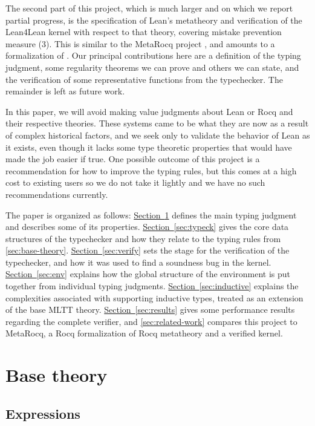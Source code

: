 \documentclass[sigplan,10pt,screen]{acmart}\settopmatter{printfolios=true,printccs=false,printacmref=false}
\newcommand{\lfl}{\textsf{Lean4Lean}\xspace}
\newcommand{\sref}[2]{\hyperref[#2]{#1~\ref{#2}}}
\begin{document}
The second part of this project, which is much larger and on which we report partial progress, is the specification of Lean's metatheory and verification of the \lfl kernel with respect to that theory, covering mistake prevention measure (3). This is similar to the MetaRocq project \cite{sozeau20,coqcoqcorrect}, and amounts to a formalization of \cite{leantt}. Our principal contributions here are a definition of the typing judgment, some regularity theorems we can prove and others we can state, and the verification of some representative functions from the typechecker. The remainder is left as future work.

In this paper, we will avoid making value judgments about Lean or Rocq and their respective theories. These systems came to be what they are now as a result of complex historical factors, and we seek only to validate the behavior of Lean as it exists, even though it lacks some type theoretic properties that would have made the job easier if true. One possible outcome of this project is a recommendation for how to improve the typing rules, but this comes at a high cost to existing users so we do not take it lightly and we have no such recommendations currently.

The paper is organized as follows: \sref{Section}{sec:base-theory} defines the main typing judgment and describes some of its properties. \sref{Section}{sec:typeck} gives the core data structures of the typechecker and how they relate to the typing rules from \autoref{sec:base-theory}. \sref{Section}{sec:verify} sets the stage for the verification of the typechecker, and how it was used to find a soundness bug in the kernel. \sref{Section}{sec:env} explains how the global structure of the environment is put together from individual typing judgments. \sref{Section}{sec:inductive} explains the complexities associated with supporting inductive types, treated as an extension of the base MLTT theory. \sref{Section}{sec:results} gives some performance results regarding the complete verifier, and \autoref{sec:related-work} compares this project to MetaRocq, a Rocq formalization of Rocq metatheory and a verified kernel.

\section{Base theory}\label{sec:base-theory}

\subsection{Expressions}
\end{document}
